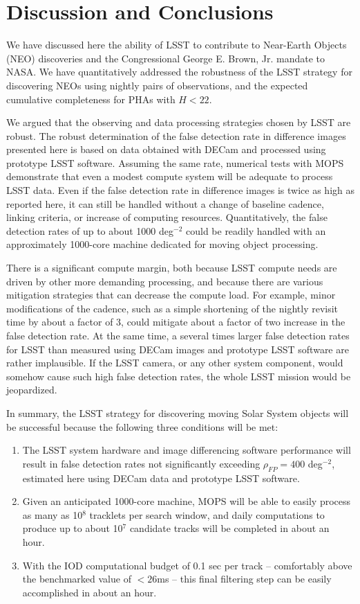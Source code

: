 

\section{Discussion and Conclusions}

We have discussed here the ability of LSST to contribute to Near-Earth Objects (NEO) discoveries and
the Congressional George E. Brown, Jr. mandate to NASA. We have quantitatively addressed
the robustness of the LSST strategy for discovering NEOs using nightly pairs of observations, and
the expected cumulative completeness for PHAs with $H<22$.

We argued that the observing and data processing strategies chosen by LSST are robust. The
robust determination of the false detection rate in difference images presented here is based
on data obtained with DECam and processed using prototype LSST software. Assuming the same rate,
numerical tests with MOPS demonstrate that even a modest compute system will be adequate to
process LSST data. Even if the false detection rate in difference images is twice as high as
reported here, it can still be handled without a change of baseline cadence, linking criteria, or
increase of computing resources. Quantitatively, the false detection rates of up to about
1000 deg$^{-2}$ could be readily handled with an approximately 1000-core machine dedicated for
moving object processing.

There is a significant compute margin, both because LSST compute needs are driven by other more
demanding processing, and because there are various mitigation strategies that can decrease the
compute load. For example, minor modifications of the cadence, such as a simple shortening
of the nightly revisit time by about a factor of 3, could mitigate about a factor of two increase in
the false detection rate. At the same time, a several times larger false detection rates for LSST
than measured using DECam images and prototype LSST software are rather implausible. If the
LSST camera, or any other system component, would somehow cause such high false detection rates,
the whole LSST mission would be jeopardized.

In summary, the LSST strategy for discovering moving Solar System objects will be successful
because the following three conditions will be met:
\begin{enumerate}
\item The LSST system hardware and image differencing software performance will result in false detection
          rates not significantly exceeding $\rho_{FP} =  400$ deg$^{-2}$, estimated here using DECam data
          and prototype LSST software.
\item Given an anticipated 1000-core machine, MOPS will be able to easily process as many as
         10$^8$ tracklets per search window, and daily computations to produce up to about 10$^7$
         candidate tracks will be completed in about an hour.
\item With the IOD computational budget of 0.1 sec per track -- comfortably above the benchmarked value of $<26$ms -- this final filtering step can
         be easily accomplished in about an hour.
\end{enumerate}


